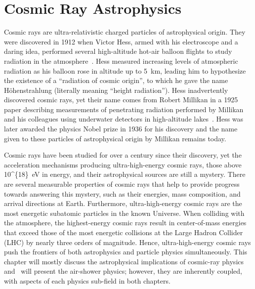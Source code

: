 %
%
\chapter{Cosmic Ray Astrophysics}\label{chap:cosmicrays}
Cosmic rays are ultra-relativistic charged particles of astrophysical origin.
They were discovered in 1912 when Victor Hess, armed with his electroscope and a daring idea, performed several high-altitude hot-air balloon flights to study radiation in the atmosphere~\cite{victorhess_1912}.
Hess measured increasing levels of atmospheric radiation as his balloon rose in altitude up to \qty{5}{\kilo\meter}, leading him to hypothesize the existence of a ``radiation of cosmic origin'', to which he gave the name H{\"o}henstrahlung (literally meaning ``height radiation'').
Hess inadvertently discovered cosmic rays, yet their name comes from Robert Millikan in a 1925 paper describing measurements of penetrating radiation performed by Millikan and his colleagues using underwater detectors in high-altitude lakes~\cite{millikan_1925}.
Hess was later awarded the physics Nobel prize in 1936 for his discovery and the name given to these particles of astrophysical origin by Millikan remains today.

Cosmic rays have been studied for over a century since their discovery, yet the acceleration mechanisms producing ultra-high-energy cosmic rays, those above \qty[parse-numbers=false]{10^{18}}{\electronvolt} in energy, and their astrophysical sources are still a mystery.
There are several measurable properties of cosmic rays that help to provide progress towards answering this mystery, such as their energies, mass composition, and arrival directions at Earth.
Furthermore, ultra-high-energy cosmic rays are the most energetic subatomic particles in the known Universe.
When colliding with the atmosphere, the highest-energy cosmic rays result in center-of-mass energies that exceed those of the most energetic collisions at the Large Hadron Collider (LHC) by nearly three orders of magnitude.
Hence, ultra-high-energy cosmic rays push the frontiers of both astrophysics and particle physics simultaneously.
This chapter will mostly discuss the astrophysical implications of cosmic-ray physics and~ will present the air-shower physics; however, they are inherently coupled, with aspects of each physics sub-field in both chapters.





